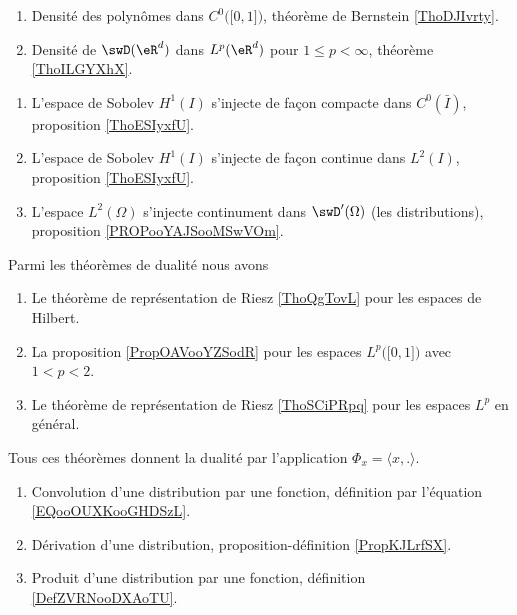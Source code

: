 \begin{enumerate}
    \item 
        Densité des polynômes dans \( C^0\big( \mathopen[ 0 , 1 \mathclose] \big)\), théorème de Bernstein \ref{ThoDJIvrty}.
    \item
        Densité de \( \swD(\eR^d)\) dans \( L^p(\eR^d)\) pour \( 1\leq p<\infty\), théorème \ref{ThoILGYXhX}.
\end{enumerate}

\begin{enumerate}
        \item
            L'espace de Sobolev \( H^1(I)\) s'injecte de façon compacte dans \( C^0(\bar I)\), proposition \ref{ThoESIyxfU}.
        \item
            L'espace de Sobolev \( H^1(I)\) s'injecte de façon continue dans \( L^2(I)\), proposition \ref{ThoESIyxfU}.
        \item
            L'espace \( L^2(\Omega)\) s'injecte continument dans \( \swD'(\Omega)\) (les distributions), proposition \ref{PROPooYAJSooMSwVOm}.
\end{enumerate}

Parmi les théorèmes de dualité nous avons
\begin{enumerate}
    \item
        Le théorème de représentation de Riesz \ref{ThoQgTovL} pour les espaces de Hilbert.
    \item
        La proposition \ref{PropOAVooYZSodR} pour les espaces \( L^p\big( \mathopen[ 0 , 1 \mathclose] \big)\) avec \( 1<p<2\).
    \item
        Le théorème de représentation de Riesz \ref{ThoSCiPRpq} pour les espaces \( L^p\) en général.
\end{enumerate}
Tous ces théorèmes donnent la dualité par l'application \( \Phi_x=\langle x, .\rangle \).

\begin{enumerate}
    \item
        Convolution d'une distribution par une fonction, définition par l'équation \eqref{EQooOUXKooGHDSzL}.
    \item
        Dérivation d'une distribution, proposition-définition \ref{PropKJLrfSX}.
    \item
        Produit d'une distribution par une fonction, définition \ref{DefZVRNooDXAoTU}.
\end{enumerate}

